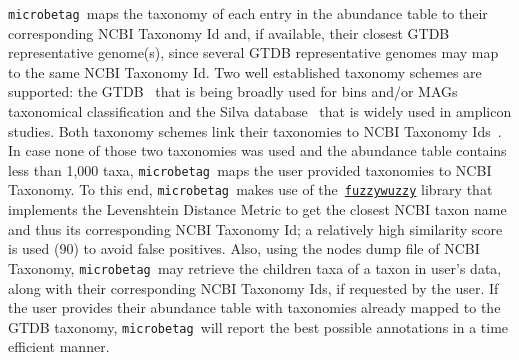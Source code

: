 \documentclass[sn-mathphys,Numbered, lineno]{sn-jnl}  %
\theoremstyle{thmstyleone}%
\theoremstyle{thmstyletwo}%
\theoremstyle{thmstylethree}%
\newcommand{\microbetag}{\texttt{microbetag }}
\begin{document}
        \microbetag maps the taxonomy of each entry in the abundance table to their corresponding NCBI Taxonomy Id and, if available, their closest GTDB representative genome(s), since several GTDB representative genomes may map to the same NCBI Taxonomy Id.
        Two well established taxonomy schemes are supported: the GTDB~\cite{parks2022gtdb} that is being broadly used for bins and/or MAGs taxonomical classification and the Silva database~\cite{quast2012silva} that is widely used in amplicon studies. Both taxonomy schemes link their taxonomies to NCBI Taxonomy Ids~\cite{schoch2020ncbi}.
        In case none of those two taxonomies was used and the abundance table contains less than 1,000 taxa, \microbetag maps the user provided taxonomies to NCBI Taxonomy. %
        To this end, \microbetag makes use of the~\href{https://github.com/seatgeek/thefuzz}{\texttt{fuzzywuzzy}} library that implements the Levenshtein Distance Metric to get the closest NCBI taxon name and thus its corresponding NCBI Taxonomy Id; a relatively high similarity score is used (90) to avoid false positives. 
        Also, using the nodes dump file of NCBI Taxonomy, \microbetag may retrieve the children taxa of a taxon in user's data, along with their corresponding NCBI Taxonomy Ids, if requested by the user.
        If the user provides their abundance table with taxonomies already mapped to the GTDB taxonomy, \microbetag will report the best possible annotations in a time efficient manner. 
        
        
        
\end{document}
